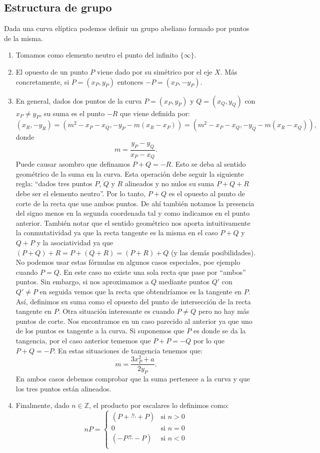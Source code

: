 \documentclass[11pt]{article}
\begin{document}
\subsection{Estructura de grupo}
Dada una curva elíptica podemos definir un grupo abeliano formado por puntos de la misma. 
\begin{enumerate}
\item Tomamos como elemento neutro el punto del infinito $ \{\infty\} $.
\item El opuesto de un punto $ P $ viene dado por su simétrico por el eje $ X $. Más concretamente, si $ P = (x_P, y_P) $ entonces $ -P = (x_P, -y_P) $.
\item En general, dados dos puntos de la curva $ P = (x_P, y_P) $ y $ Q = (x_Q, y_Q) $ con $ x_P \neq y_P $, su suma es el punto $ -R $ que viene definida por:
\[
(x_R, -y_R) =(m^2 − x_P − x_Q, -y_P - m(x_R − x_P )) = (m^2 − x_P − x_Q, -y_Q - m(x_R − x_Q )),
\]
donde
\[
m = \frac{y_P-y_Q}{x_P-x_Q}.
\]
Puede causar asombro que definamos $ P+Q=-R $. Esto se deba al sentido geométrico de la suma en la curva. Esta operación debe seguir la siguiente regla: ``dados tres puntos $ P$, $ Q $ y $ R $ alineados y no nulos su suma $ P + Q + R $ debe ser el elemento neutro''. Por lo tanto, $ P +Q $ es el opuesto al punto de corte de la recta que une ambos puntos. De ahí también notamos la presencia del signo menos en la segunda coordenada tal y como indicamos en el punto anterior. También notar que el sentido geométrico nos aporta intuitivamente la conmutatividad ya que la recta tangente es la misma en el caso $ P+Q $ y $ Q+P $ y la asociatividad ya que $ (P+Q) + R = P + (Q+R) = (P+R) + Q$ (y las demás posibilidades).\\

No podemos usar estas fórmulas en algunos casos especiales, poe ejemplo cuando $ P=Q $. En este caso no existe una sola recta que pase por ``ambos'' puntos. Sin embargo, si nos aproximamos a $ Q $ mediante puntos $ Q' $ con $ Q' \neq P $ en seguida vemos que la recta que obtendríamos es la tangente en $ P $. Así, definimos su suma como el opuesto del punto de intersección de la recta tangente en $ P $. Otra situación interesante es cuando $ P \neq Q $ pero no hay más puntos de corte. Nos encontramos en un caso parecido al anterior ya que uno de los puntos es tangente a la curva. Si suponemos que $ P $ es donde se da la tangencia, por el caso anterior tememos que $ P + P = -Q $ por lo que $ P + Q = -P $. En estas situaciones de tangencia tenemos que:
\[
m = \frac{3x^{2}_P + a}{2y_P}.
\]
En ambos casos debemos comprobar que la suma pertenece a la curva y que los tres puntos están alineados.

\item Finalmente, dado $ n \in \mathbb{Z} $, el producto por escalares lo definimos como:
\[   
nP = 
\begin{cases}
 (P+\stackrel{n}{\cdots}+P) &\text{si } n > 0\\
0 &\text{si } n = 0\\
(-P\stackrel{n}{\cdots}-P) &\text{si } n < 0\\
\end{cases}
\]
\end{enumerate}
\end{document}
